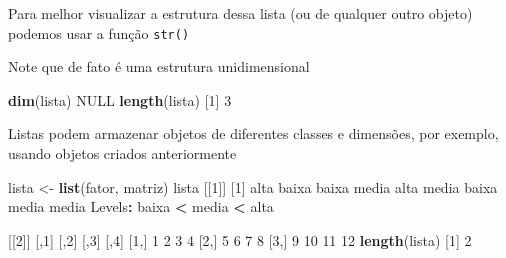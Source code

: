 \documentclass[10pt,a4paper]{book}
\newenvironment{Shaded}{\begin{snugshade}}{\end{snugshade}}
\newcommand{\KeywordTok}[1]{\textcolor[rgb]{0.13,0.29,0.53}{\textbf{#1}}}
\newcommand{\DecValTok}[1]{\textcolor[rgb]{0.00,0.00,0.81}{#1}}
\newcommand{\StringTok}[1]{\textcolor[rgb]{0.31,0.60,0.02}{#1}}
\newcommand{\OtherTok}[1]{\textcolor[rgb]{0.56,0.35,0.01}{#1}}
\newcommand{\OperatorTok}[1]{\textcolor[rgb]{0.81,0.36,0.00}{\textbf{#1}}}
\newcommand{\ErrorTok}[1]{\textcolor[rgb]{0.64,0.00,0.00}{\textbf{#1}}}
\newcommand{\NormalTok}[1]{#1}
\begin{document}
Para melhor visualizar a estrutura dessa lista (ou de qualquer outro
objeto) podemos usar a função \texttt{str()}

\begin{Shaded}
\end{Shaded}

Note que de fato é uma estrutura unidimensional

\begin{Shaded}
\begin{Highlighting}[]
\KeywordTok{dim}\NormalTok{(lista)}
\OtherTok{NULL}
\KeywordTok{length}\NormalTok{(lista)}
\NormalTok{[}\DecValTok{1}\NormalTok{] }\DecValTok{3}
\end{Highlighting}
\end{Shaded}

Listas podem armazenar objetos de diferentes classes e dimensões, por
exemplo, usando objetos criados anteriormente

\begin{Shaded}
\begin{Highlighting}[]
\NormalTok{lista <-}\StringTok{ }\KeywordTok{list}\NormalTok{(fator, matriz)}
\NormalTok{lista}
\NormalTok{[[}\DecValTok{1}\NormalTok{]]}
\NormalTok{[}\DecValTok{1}\NormalTok{] alta  baixa baixa media alta  media baixa media media}
\NormalTok{Levels}\OperatorTok{:}\StringTok{ }\NormalTok{baixa }\OperatorTok{<}\StringTok{ }\NormalTok{media }\OperatorTok{<}\StringTok{ }\NormalTok{alta}

\NormalTok{[[}\DecValTok{2}\NormalTok{]]}
\NormalTok{     [,}\DecValTok{1}\NormalTok{] [,}\DecValTok{2}\NormalTok{] [,}\DecValTok{3}\NormalTok{] [,}\DecValTok{4}\NormalTok{]}
\NormalTok{[}\DecValTok{1}\NormalTok{,]    }\DecValTok{1}    \DecValTok{2}    \DecValTok{3}    \DecValTok{4}
\NormalTok{[}\DecValTok{2}\NormalTok{,]    }\DecValTok{5}    \DecValTok{6}    \DecValTok{7}    \DecValTok{8}
\NormalTok{[}\DecValTok{3}\NormalTok{,]    }\DecValTok{9}   \DecValTok{10}   \DecValTok{11}   \DecValTok{12}
\KeywordTok{length}\NormalTok{(lista)}
\NormalTok{[}\DecValTok{1}\NormalTok{] }\DecValTok{2}
\end{Highlighting}
\end{Shaded}
\end{document}
